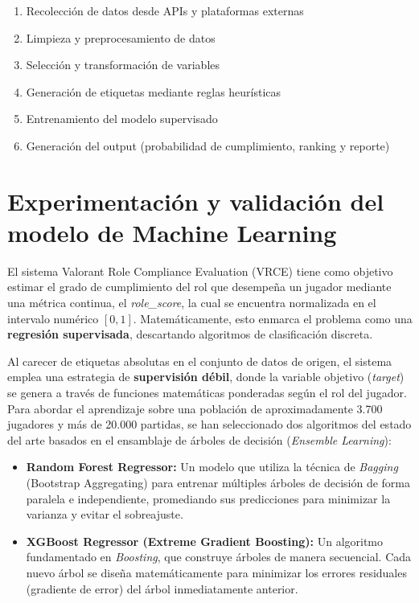 \documentclass{ULBreport} %
\begin{document}
\begin{enumerate}
    \item Recolección de datos desde APIs y plataformas externas
    \item Limpieza y preprocesamiento de datos
    \item Selección y transformación de variables
    \item Generación de etiquetas mediante reglas heurísticas
    \item Entrenamiento del modelo supervisado
    \item Generación del output (probabilidad de cumplimiento, ranking y reporte)
\end{enumerate}

\chapter{Experimentación y validación del modelo de Machine Learning}

El sistema Valorant Role Compliance Evaluation (VRCE) tiene como objetivo estimar el grado de cumplimiento del rol que desempeña un jugador mediante una métrica continua, el \textit{role\_score}, la cual se encuentra normalizada en el intervalo numérico $[0, 1]$. Matemáticamente, esto enmarca el problema como una \textbf{regresión supervisada}, descartando algoritmos de clasificación discreta.

Al carecer de etiquetas absolutas en el conjunto de datos de origen, el sistema emplea una estrategia de \textbf{supervisión débil}, donde la variable objetivo (\textit{target}) se genera a través de funciones matemáticas ponderadas según el rol del jugador. Para abordar el aprendizaje sobre una población de aproximadamente 3.700 jugadores y más de 20.000 partidas, se han seleccionado dos algoritmos del estado del arte basados en el ensamblaje de árboles de decisión (\textit{Ensemble Learning}):

\begin{itemize}
    \item \textbf{Random Forest Regressor:} Un modelo que utiliza la técnica de \textit{Bagging} (Bootstrap Aggregating) para entrenar múltiples árboles de decisión de forma paralela e independiente, promediando sus predicciones para minimizar la varianza y evitar el sobreajuste.
    \item \textbf{XGBoost Regressor (Extreme Gradient Boosting):} Un algoritmo fundamentado en \textit{Boosting}, que construye árboles de manera secuencial. Cada nuevo árbol se diseña matemáticamente para minimizar los errores residuales (gradiente de error) del árbol inmediatamente anterior.
\end{itemize}
\end{document}

